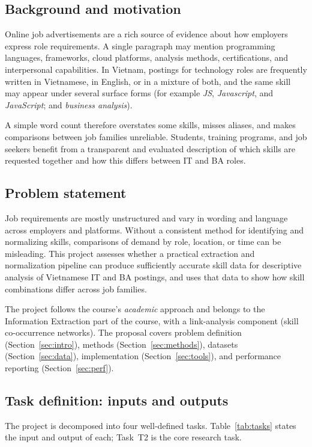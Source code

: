 \documentclass[12pt,a4paper]{article}
\begin{document}
\subsection{Background and motivation}
Online job advertisements are a rich source of evidence about how employers
express role requirements. A single paragraph may mention programming
languages, frameworks, cloud platforms, analysis methods, certifications, and
interpersonal capabilities. In Vietnam, postings for technology roles are
frequently written in Vietnamese, in English, or in a mixture of both, and
the same skill may appear under several surface forms (for example
\emph{JS}, \emph{Javascript}, and \emph{JavaScript}; and \emph{business analysis}).

A simple word count therefore overstates some skills, misses aliases, and
makes comparisons between job families unreliable. Students, training
programs, and job seekers benefit from a transparent and evaluated
description of which skills are requested together and how this differs
between IT and BA roles.

\subsection{Problem statement}
Job requirements are mostly unstructured and vary in wording and language
across employers and platforms. Without a consistent method for identifying
and normalizing skills, comparisons of demand by role, location, or time can
be misleading. This project assesses whether a practical extraction and
normalization pipeline can produce sufficiently accurate skill data for
descriptive analysis of Vietnamese IT and BA postings, and uses that data to
show how skill combinations differ across job families.

The project follows the course's \emph{academic} approach and belongs to
the Information Extraction part of the course, with a link-analysis
component (skill co-occurrence networks). The proposal covers problem
definition (Section~\ref{sec:intro}), methods
(Section~\ref{sec:methods}), datasets (Section~\ref{sec:data}),
implementation (Section~\ref{sec:tools}), and performance reporting
(Section~\ref{sec:perf}).

\subsection{Task definition: inputs and outputs}\label{sec:taskdef}
The project is decomposed into four well-defined tasks.
Table~\ref{tab:tasks} states the input and output of each; Task~T2 is the
core research task.
\end{document}

